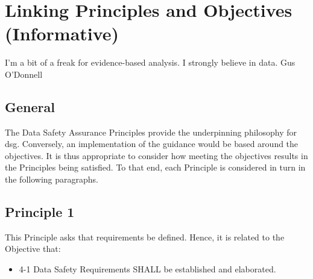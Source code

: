 %
%
\section{Linking Principles and Objectives (Informative)} \label{bkm:principlesobjectives}

\dsiwgSectionQuote
  {I'm a bit of a freak for evidence-based analysis. I strongly believe in data.}
  {Gus O'Donnell}


\subsection{General}

The Data Safety Assurance Principles provide the underpinning philosophy for \gls{dsg}. Conversely, an implementation of the guidance would be based around the objectives. It is thus appropriate to consider how meeting the objectives results in the Principles being satisfied. To that end, each Principle is considered in turn in the following paragraphs.


\subsection{Principle 1}

This Principle asks that requirements be defined. Hence, it is related to the Objective that:

\begin{itemize}
	\item \textcolor{dsiwgAccentColour}{4-1} Data Safety Requirements SHALL be established and elaborated.
\end{itemize}


